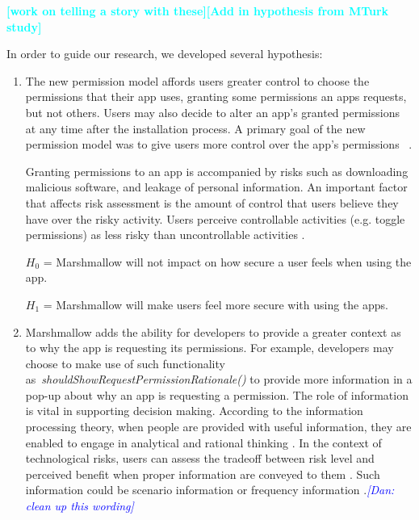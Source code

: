 \documentclass{sig-alternate-05-2015}
\newcommand{\todo}[1]{\textcolor{cyan}{\textbf{[#1]}}}
\newcommand{\dan}[1]{\textcolor{blue}{{\it [Dan: #1]}}}
\begin{document}
\todo{work on telling a story with these}\todo{Add in hypothesis from MTurk study}

In order to guide our research, we developed several hypothesis:



\begin{enumerate}

	\item The new permission model affords users greater control to choose the permissions that their app uses, granting some permissions an apps requests, but not others. Users may also decide to alter an app's granted permissions at any time after the installation process. A primary goal of the new permission model was to give users more control over the app's permissions ~\cite{android_developer_URL}.


Granting permissions to an app is accompanied by risks such as downloading malicious software, and leakage of personal information. An important factor that affects risk assessment is the amount of control that users believe they have over the risky activity. Users perceive controllable activities (e.g. toggle permissions) as less risky than uncontrollable activities \cite{hale1987individual}.

$H_0$ = Marshmallow will not impact on how secure a user feels when using the app.

$H_1$ = Marshmallow will make users feel more secure with using the apps.




\item Marshmallow adds the ability for developers to provide a greater context as to why the app is requesting its permissions. For example, developers may choose to make use of such functionality as~\emph{shouldShowRequestPermissionRationale()} to provide more information in a pop-up about why an app is requesting a permission. The role of information is vital in supporting decision making. According to the information processing theory, when people are provided with useful information, they are enabled to engage in analytical and rational thinking \cite{epstein1994integration}. In the context of technological risks, users can assess the tradeoff between risk level and perceived benefit when proper information are conveyed to them \cite{fischhoff1978safe}. Such information could be scenario information or frequency information \cite{slovic2005affect}.\dan{clean up this wording}




\end{enumerate}
\end{document}
